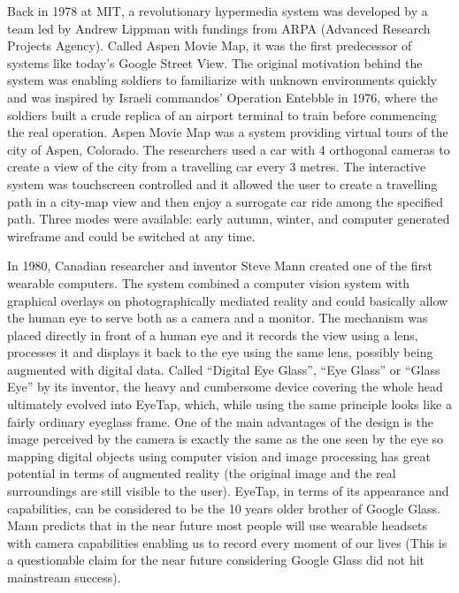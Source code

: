 \documentclass[12pt, a4paper]{article}
\begin{document}
Back in 1978 at MIT, a revolutionary hypermedia system was developed by a team led by Andrew Lippman with fundings from ARPA (Advanced Research Projects Agency). Called Aspen Movie Map, it was the first predecessor of systems like today’s Google Street View. The original motivation behind the system was enabling soldiers to familiarize with unknown environments quickly and was inspired by Israeli commandos’ Operation Entebble in 1976, where the soldiers built a crude replica of an airport terminal to train before commencing the real operation. Aspen Movie Map was a system providing virtual tours of the city of Aspen, Colorado. The researchers used a car with 4 orthogonal cameras to create a view of the city from a travelling car every 3 metres. The interactive system was touchscreen controlled and it allowed the user to create a travelling path in a city-map view and then enjoy a surrogate car ride among the specified path. Three modes were available: early autumn, winter, and computer generated wireframe and could be switched at any time.

In 1980, Canadian researcher and inventor Steve Mann created one of the first wearable computers. The system combined a computer vision system with graphical overlays on photographically mediated reality and could basically allow the human eye to serve both as a camera and a monitor. The mechanism was placed directly in front of a human eye and it records the view using a lens, processes it and displays it back to the eye using the same lens, possibly being augmented with digital data. Called “Digital Eye Glass”, “Eye Glass” or “Glass Eye” by its inventor, the heavy and cumbersome device covering the whole head ultimately evolved into EyeTap, which, while using the same principle looks like a fairly ordinary eyeglass frame. One of the main advantages of the design is the image perceived by the camera is exactly the same as the one seen by the eye so mapping digital objects using computer vision and image processing has great potential in terms of augmented reality (the original image and the real surroundings are still visible to the user). EyeTap, in terms of its appearance and capabilities, can be considered to be the 10 years older brother of Google Glass. Mann predicts that in the near future most people will use wearable headsets with camera capabilities enabling us to record every moment of our lives (This is a questionable claim for the near future considering Google Glass did not hit mainstream success).
\end{document}
